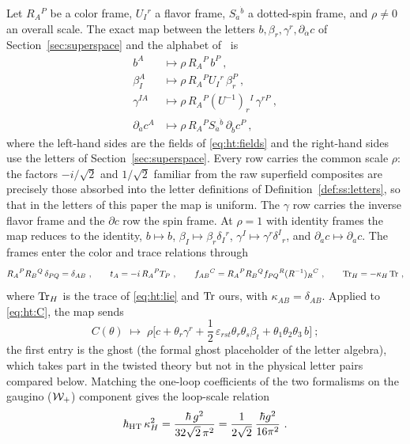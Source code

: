 Let $R_{A}{}^{P}$ be a color frame, $U_{I}{}^{r}$ a flavor frame,
$S_{\dot a}{}^{\dot b}$ a dotted-spin frame, and $\rho\neq0$ an overall
scale. The exact map between the letters
$b,\beta_{r},\gamma^{r},\partial_{\dot\alpha}c$ of
Section~\ref{sec:superspace} and the alphabet of~\cite{BK} is
\begin{equation}\label{eq:ht:dictionary}
\begin{aligned}
b^{A}&\longmapsto\rho\,R_{A}{}^{P}\,b^{P} \ ,\\
\beta_{I}^{A}&\longmapsto\rho\,R_{A}{}^{P}U_{I}{}^{r}\,
\beta_{r}^{P} \ ,\\
\gamma^{IA}&\longmapsto\rho\,R_{A}{}^{P}(U^{-1})_{r}{}^{I}\,
\gamma^{rP} \ ,\\
\partial_{\dot a}c^{A}&\longmapsto\rho\,R_{A}{}^{P}
S_{\dot a}{}^{\dot b}\,\partial_{\dot b}c^{P} \ ,
\end{aligned}
\end{equation}
where the left-hand sides are the fields of \eqref{eq:ht:fields} and the
right-hand sides use the letters of Section~\ref{sec:superspace}. Every row
carries the common scale $\rho$: the factors $-i/\sqrt2$ and $1/\sqrt2$
familiar from the raw superfield composites are precisely those absorbed
into the letter definitions of Definition~\ref{def:ss:letters}, so that in
the letters of this paper the map is uniform. The $\gamma$ row carries the
inverse flavor frame and the $\partial c$ row the spin frame. At $\rho=1$
with identity frames the map reduces to the identity,
$b\mapsto b$, $\beta_{I}\mapsto\beta_{r}\delta_{I}{}^{r}$,
$\gamma^{I}\mapsto\gamma^{r}\delta^{I}{}_{r}$, and
$\partial_{\dot a}c\mapsto\partial_{\dot a}c$. The frames enter the color
and trace relations through
\begin{equation}\label{eq:ht:frames}
R_{A}{}^{P}R_{B}{}^{Q}\,\delta_{PQ}=\delta_{AB} \ ,\qquad
t_{A}=-i\,R_{A}{}^{P}T_{P} \ ,\qquad
f_{AB}{}^{C}=R_{A}{}^{P}R_{B}{}^{Q}f_{PQ}{}^{R}(R^{-1})_{R}{}^{C} \ ,\qquad
\Tr_{H}=-\kappa_{H}\Tr \ ,
\end{equation}
where $\operatorname{Tr}_{H}$ is the trace of \eqref{eq:ht:lie} and $\operatorname{Tr}$ ours, with
$\kappa_{AB}=\delta_{AB}$. Applied to \eqref{eq:ht:C}, the map sends
\begin{equation}\label{eq:ht:Cimage}
C(\theta)\;\longmapsto\;
\rho\Big[c+\theta_{r}\gamma^{r}
+\frac{1}{2}\,\varepsilon_{rst}\theta_{r}\theta_{s}\beta_{t}
+\theta_{1}\theta_{2}\theta_{3}\,b\Big] \ ;
\end{equation}
the first entry is the ghost (the formal ghost placeholder of the letter
algebra), which takes part in the twisted theory but not in the physical
letter pairs compared below. Matching the one-loop coefficients of the two
formalisms on the gaugino ($\mathcal{W}_{+}$) component gives the loop-scale relation
\begin{equation}\label{eq:ht:loopscale}
\hbar_{\mathrm{HT}}\,\kappa_{H}^{2}
=\frac{\hbar\,g^{2}}{32\sqrt2\,\pi^{2}}
=\frac{1}{2\sqrt2}\,\frac{\hbar g^{2}}{16\pi^{2}} \ .
\end{equation}

